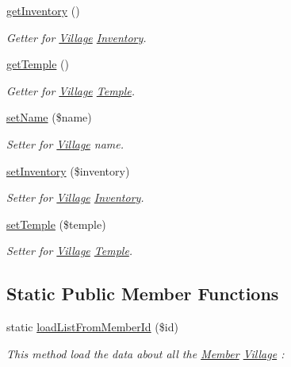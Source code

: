 \begin{DoxyCompactItemize}
\mbox{\hyperlink{classVillage_a9c8354350df0f41853c44799625345d4}{get\+Inventory}} ()
\begin{DoxyCompactList}\small\item\em Getter for \mbox{\hyperlink{classVillage}{Village}} \mbox{\hyperlink{classInventory}{Inventory}}. \end{DoxyCompactList}\item 
\mbox{\hyperlink{classVillage_a75b6534f378f19bb04147fd5c85a1de9}{get\+Temple}} ()
\begin{DoxyCompactList}\small\item\em Getter for \mbox{\hyperlink{classVillage}{Village}} \mbox{\hyperlink{classTemple}{Temple}}. \end{DoxyCompactList}\item 
\mbox{\label{classVillage_a3618cf8e4e09b2b76ee0761f954ea2e5}} 
\mbox{\hyperlink{classVillage_a3618cf8e4e09b2b76ee0761f954ea2e5}{set\+Name}} (\$name)
\begin{DoxyCompactList}\small\item\em Setter for \mbox{\hyperlink{classVillage}{Village}} name. \end{DoxyCompactList}\item 
\mbox{\label{classVillage_a03a12402942f6c93091dd6e8bf4c2fee}} 
\mbox{\hyperlink{classVillage_a03a12402942f6c93091dd6e8bf4c2fee}{set\+Inventory}} (\$inventory)
\begin{DoxyCompactList}\small\item\em Setter for \mbox{\hyperlink{classVillage}{Village}} \mbox{\hyperlink{classInventory}{Inventory}}. \end{DoxyCompactList}\item 
\mbox{\label{classVillage_a5ec3883315293ce70ff632aa088548fd}} 
\mbox{\hyperlink{classVillage_a5ec3883315293ce70ff632aa088548fd}{set\+Temple}} (\$temple)
\begin{DoxyCompactList}\small\item\em Setter for \mbox{\hyperlink{classVillage}{Village}} \mbox{\hyperlink{classTemple}{Temple}}. \end{DoxyCompactList}\end{DoxyCompactItemize}
\subsection*{Static Public Member Functions}
\begin{DoxyCompactItemize}
\item 
static \mbox{\hyperlink{classVillage_a1cedfa6d0cc4f8c432265c5b8309f931}{load\+List\+From\+Member\+Id}} (\$id)
\begin{DoxyCompactList}\small\item\em This method load the data about all the \mbox{\hyperlink{classMember}{Member}} \mbox{\hyperlink{classVillage}{Village}} \+: \end{DoxyCompactList}\end{DoxyCompactItemize}
